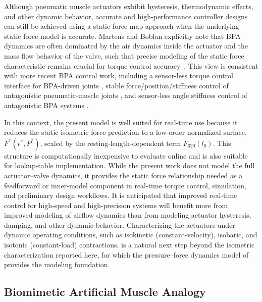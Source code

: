 Although pneumatic muscle actuators exhibit hysteresis, thermodynamic effects, and other dynamic behavior, accurate and high-performance controller designs can still be achieved using a static force map approach when the underlying static force model is accurate. Martens and Boblan explicitly note that BPA dynamics are often dominated by the air dynamics inside the actuator and the mass flow behavior of the valve, such that precise modeling of the static force characteristic remains crucial for torque control \mbox{accuracy \citep{martens_modeling_2017}.} This view is consistent with more recent BPA control work, including a sensor-less torque control interface for BPA-driven joints \citep{martens_framework_2018}, stable force/position/stiffness control of antagonistic pneumatic-muscle joints \citep{ugurlu2019stable, hunt_development_2017}, and sensor-less angle stiffness control of antagonistic BPA systems \citep{shinSensorlessAngleStiffness2022}. 

In this context, the present model is well suited for real-time use because it reduces the static isometric force prediction to a low-order normalized surface, $F^*(\epsilon^*,P^*)$, scaled by the resting-length-dependent term $F_{620}(l_0)$. This structure is computationally inexpensive to evaluate online and is also suitable for lookup-table implementation. While the present work does not model the full actuator--valve dynamics, it provides the static force relationship needed as a feedforward or inner-model component in real-time torque control, simulation, and preliminary design workflows. It is anticipated that improved real-time control for high-speed and high-precision systems will benefit more from improved modeling of airflow dynamics than from modeling actuator hysteresis, damping, and other dynamic behavior. Characterizing the actuators under dynamic operating conditions, such as isokinetic (constant-velocity), isobaric, and isotonic (constant-load) contractions, is a natural next step beyond the isometric characterization reported here, for which the pressure--force dynamics model of \citet{elzein_pressure_2025} provides the modeling foundation.


\subsection{Biomimetic Artificial Muscle Analogy}\label{sec:disc_bio}

